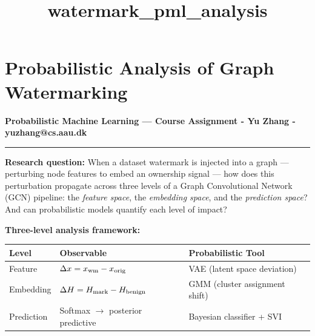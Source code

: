 \documentclass[11pt]{article}
\title{watermark\_pml\_analysis}
\begin{document}
    
    \maketitle
    
    

    
    \section{Probabilistic Analysis of Graph
Watermarking}\label{probabilistic-analysis-of-graph-watermarking}

\textbf{Probabilistic Machine Learning --- Course Assignment - Yu Zhang
- yuzhang@cs.aau.dk}

\begin{center}\rule{0.5\linewidth}{0.5pt}\end{center}

\textbf{Research question:} When a dataset watermark is injected into a
graph --- perturbing node features to embed an ownership signal --- how
does this perturbation propagate across three levels of a Graph
Convolutional Network (GCN) pipeline: the \emph{feature space}, the
\emph{embedding space}, and the \emph{prediction space}? And can
probabilistic models quantify each level of impact?

\textbf{Three-level analysis framework:}

\begin{longtable}[]{@{}
  >{\raggedright\arraybackslash}p{}
  >{\raggedright\arraybackslash}p{}
  >{\raggedright\arraybackslash}p{}@{}}
\toprule\noalign{}
\begin{minipage}[b]{\linewidth}\raggedright
Level
\end{minipage} & \begin{minipage}[b]{\linewidth}\raggedright
Observable
\end{minipage} & \begin{minipage}[b]{\linewidth}\raggedright
Probabilistic Tool
\end{minipage} \\
\midrule\noalign{}
\endhead
\bottomrule\noalign{}
\endlastfoot
Feature & \(\Delta x = x_{\rm wm} - x_{\rm orig}\) & VAE (latent space
deviation) \\
Embedding & \(\Delta H = H_{\rm mark} - H_{\rm benign}\) & GMM (cluster
assignment shift) \\
Prediction & Softmax \(\rightarrow\) posterior predictive & Bayesian
classifier + SVI \\
\end{longtable}
\end{document}
